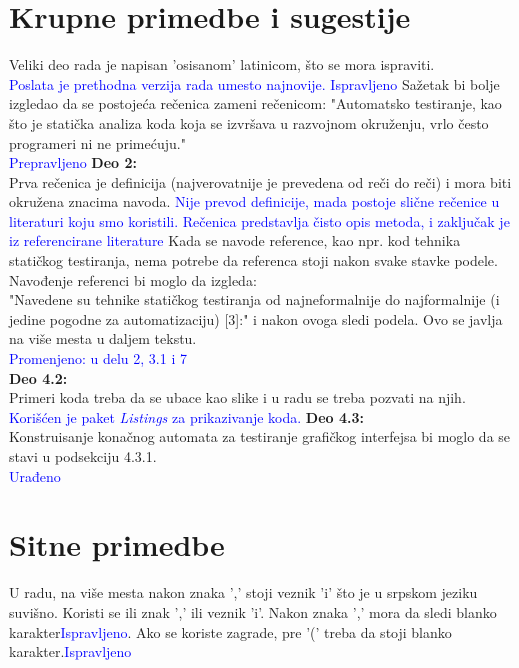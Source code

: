 \documentclass[a4paper]{report}
\newcommand{\odgovor}[1]{\textcolor{blue}{#1}}
\begin{document}
\section{Krupne primedbe i sugestije}
Veliki deo rada je napisan 'osisanom' latinicom, što se mora ispraviti.\\
\odgovor{Poslata je prethodna verzija rada umesto najnovije. Ispravljeno}
Sažetak bi bolje izgledao da se postojeća rečenica zameni rečenicom: 
"Automatsko testiranje, kao što je statička analiza koda koja se izvršava u razvojnom okruženju, vrlo često programeri ni ne primećuju."\\
\odgovor{Prepravljeno}
\textbf{Deo 2:}\\
Prva rečenica je definicija (najverovatnije je prevedena od reči do reči) i mora biti okružena znacima navoda.
\odgovor{Nije prevod definicije, mada postoje slične rečenice u literaturi koju smo koristili. Rečenica predstavlja čisto opis metoda, i zaključak je iz referencirane literature}
Kada se navode reference, kao npr. kod tehnika statičkog testiranja, nema potrebe da referenca stoji nakon svake stavke podele. Navođenje referenci bi moglo da izgleda: \\
"Navedene su tehnike statičkog testiranja od najneformalnije do najformalnije (i jedine pogodne za automatizaciju) [3]:" i nakon ovoga sledi podela. Ovo se javlja na više mesta u daljem tekstu.\\
\odgovor{Promenjeno: u delu 2, 3.1 i 7}\\
\textbf{Deo 4.2:}\\
Primeri koda treba da se ubace kao slike i u radu se treba pozvati na njih. \\
\odgovor{Korišćen je paket \textit{Listings} za prikazivanje koda.}
\textbf{Deo 4.3:}\\
Konstruisanje konačnog automata za testiranje grafičkog interfejsa bi moglo da se stavi u podsekciju 4.3.1.\\
\odgovor{Urađeno}


\section{Sitne primedbe}
U radu, na više mesta nakon znaka ',' stoji veznik 'i' što je u srpskom jeziku suvišno. Koristi se ili znak ',' ili veznik 'i'. Nakon znaka ',' mora da sledi blanko karakter\odgovor{Ispravljeno}. Ako se koriste zagrade, pre '(' treba da stoji blanko karakter.\odgovor{Ispravljeno} 
\end{document}

